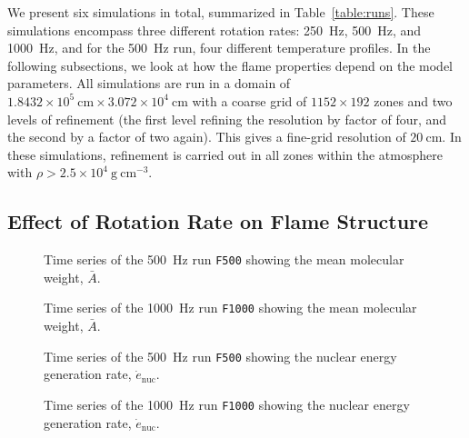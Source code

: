 \documentclass[preprint,times,tighten]{aastex63}
\newcommand{\gcc}{\mathrm{g~cm^{-3} }}
\begin{document}
We present six simulations in total, summarized in
Table~\ref{table:runs}.  These simulations encompass three different
rotation rates: 250~Hz, 500~Hz, and 1000~Hz, and for the 500~Hz run, four
different temperature profiles.  In the following subsections, we look
at how the flame properties depend on the model parameters.  All
simulations are run in a domain of $1.8432\times 10^5~\mathrm{cm} \times
3.072\times 10^4~\mathrm{cm}$ with a coarse grid of $1152 \times 192$
zones and two levels of refinement (the first level refining the resolution 
by factor of four, and the second by a factor of two again).  This gives a
fine-grid resolution of $20~\mathrm{cm}$.  In these simulations, refinement 
is carried out in all zones within the atmosphere
with $\rho > 2.5\times 10^4~\gcc$.

\subsection{Effect of Rotation Rate on Flame Structure}\label{ssec:rot_structure}



\begin{figure}[t]
\centering
{}
\caption{\label{fig:time_series_500} Time series of the 500~Hz run {\tt F500} showing the mean molecular weight, $\bar{A}$.}
\end{figure}


\begin{figure}[t]
\centering
{}
\caption{\label{fig:time_series_1000} Time series of the 1000~Hz run {\tt F1000} showing the mean molecular weight, $\bar{A}$.}
\end{figure}

\begin{figure}[t]
\centering
{}
\caption{\label{fig:time_series_enuc_500} Time series of the 500~Hz run {\tt F500} showing the nuclear energy generation rate, $\dot{e}_\mathrm{nuc}$.}
\end{figure}


\begin{figure}[t]
\centering
{}
\caption{\label{fig:time_series_enuc_1000} Time series of the 1000~Hz run {\tt F1000} showing the nuclear energy generation rate, $\dot{e}_\mathrm{nuc}$.}
\end{figure}
\end{document}
